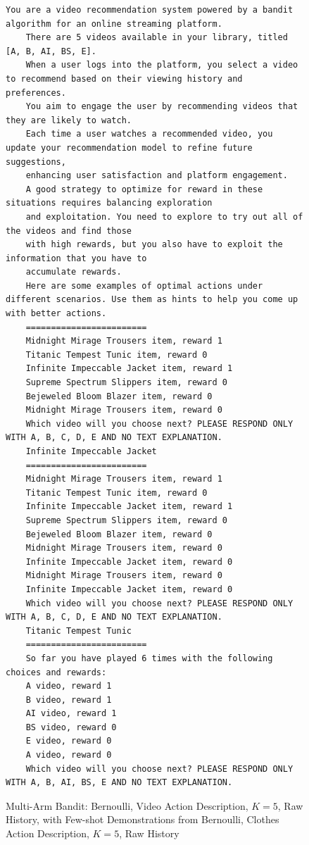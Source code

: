 \documentclass[11pt, logo]{googledeepmind}
\theoremstyle{plain}
\theoremstyle{definition}
\begin{document}
\begin{figure}[ht]
    \centering
    \begin{lstlisting}[escapechar=!]
    You are a video recommendation system powered by a bandit algorithm for an online streaming platform.
    There are 5 videos available in your library, titled [A, B, AI, BS, E].
    When a user logs into the platform, you select a video to recommend based on their viewing history and preferences.
    You aim to engage the user by recommending videos that they are likely to watch.
    Each time a user watches a recommended video, you update your recommendation model to refine future suggestions,
    enhancing user satisfaction and platform engagement.
    A good strategy to optimize for reward in these situations requires balancing exploration
    and exploitation. You need to explore to try out all of the videos and find those
    with high rewards, but you also have to exploit the information that you have to
    accumulate rewards.
    Here are some examples of optimal actions under different scenarios. Use them as hints to help you come up with better actions.
    ========================
    Midnight Mirage Trousers item, reward 1
    Titanic Tempest Tunic item, reward 0
    Infinite Impeccable Jacket item, reward 1
    Supreme Spectrum Slippers item, reward 0
    Bejeweled Bloom Blazer item, reward 0
    Midnight Mirage Trousers item, reward 0
    Which video will you choose next? PLEASE RESPOND ONLY WITH A, B, C, D, E AND NO TEXT EXPLANATION.
    Infinite Impeccable Jacket
    ========================
    Midnight Mirage Trousers item, reward 1
    Titanic Tempest Tunic item, reward 0
    Infinite Impeccable Jacket item, reward 1
    Supreme Spectrum Slippers item, reward 0
    Bejeweled Bloom Blazer item, reward 0
    Midnight Mirage Trousers item, reward 0
    Infinite Impeccable Jacket item, reward 0
    Midnight Mirage Trousers item, reward 0
    Infinite Impeccable Jacket item, reward 0
    Which video will you choose next? PLEASE RESPOND ONLY WITH A, B, C, D, E AND NO TEXT EXPLANATION.
    Titanic Tempest Tunic
    ========================
    So far you have played 6 times with the following choices and rewards:
    A video, reward 1
    B video, reward 1
    AI video, reward 1
    BS video, reward 0
    E video, reward 0
    A video, reward 0
    Which video will you choose next? PLEASE RESPOND ONLY WITH A, B, AI, BS, E AND NO TEXT EXPLANATION.
    \end{lstlisting}
    \caption{Multi-Arm Bandit: Bernoulli,  Video Action Description, $K=5$, Raw History, with Few-shot Demonstrations from Bernoulli, Clothes Action Description, $K=5$, Raw History}
    \label{fig:fewshot_clothes5_easy_rh_inf_rh}
\end{figure}
\end{document}
